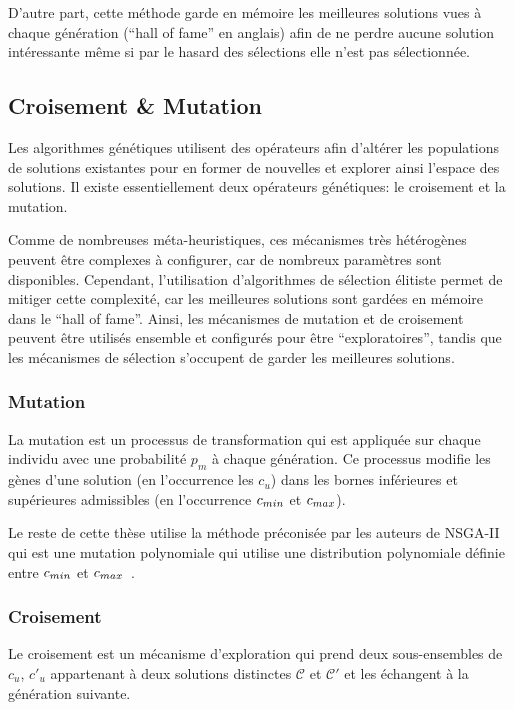 D'autre part, cette méthode garde en mémoire les meilleures solutions vues à chaque génération (``hall of fame'' en anglais) afin de ne perdre aucune solution intéressante même si par le hasard des sélections elle n'est pas sélectionnée.

\subsection{Croisement \& Mutation}
\label{cache:mutation}

Les algorithmes génétiques utilisent des opérateurs afin d'altérer les populations de solutions existantes pour en former de nouvelles et explorer ainsi l'espace des solutions.
Il existe essentiellement deux opérateurs génétiques: le croisement et la mutation.

Comme de nombreuses méta-heuristiques, ces mécanismes très hétérogènes peuvent être complexes à configurer, car de nombreux paramètres sont disponibles.
Cependant, l'utilisation d'algorithmes de sélection élitiste permet de mitiger cette complexité, car les meilleures solutions sont gardées en mémoire dans le ``hall of fame''.
Ainsi, les mécanismes de mutation et de croisement peuvent être utilisés ensemble et configurés pour être  ``exploratoires'', tandis que les mécanismes de sélection s'occupent de garder les meilleures solutions.

\subsubsection{Mutation}

La mutation est un processus de transformation qui est appliquée sur chaque individu avec une probabilité $p_m$ à chaque génération.
Ce processus modifie les gènes d'une solution (en l’occurrence les $c_u$) dans les bornes inférieures et supérieures admissibles (en l’occurrence $c_{min}$ et $c_{max}$).

Le reste de cette thèse utilise la méthode préconisée par les auteurs de NSGA-II qui est une mutation polynomiale qui utilise une distribution polynomiale définie entre $c_{min}$ et $c_{max}$~\cite{deb2014analysing}.

\subsubsection{Croisement}

Le croisement est un mécanisme d'exploration qui prend deux sous-ensembles de $c_u$, $c'_u$ appartenant à deux solutions distinctes $\mathcal{C}$ et $\mathcal{C}'$ et les échangent à la génération suivante.

